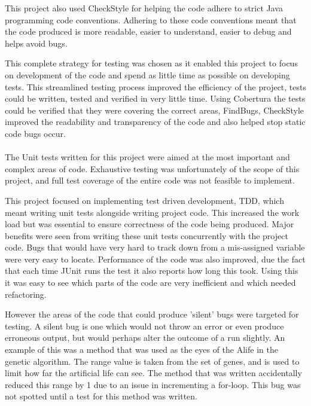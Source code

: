 \documentclass[12pt]{article}
\begin{document}
This project also used
CheckStyle for helping the code adhere to strict Java programming code conventions. Adhering to these code conventions meant that
the code produced is more readable, easier to understand, easier to debug and helps avoid bugs.

This complete strategy for testing was chosen as it enabled this project to focus on development of the code and spend as little
time as possible on developing tests. This streamlined testing process improved the efficiency of the project, tests could 
be written, tested and verified in very little time. Using Cobertura the tests could be verified that they were covering the
correct areas, FindBugs, CheckStyle improved the readability and transparency of the code and also helped stop static code
bugs occur.


\paragraph{}

The Unit tests written for this project were aimed at the most important and complex areas of code. Exhaustive testing was 
unfortunately of the scope of this project, and full test coverage of the entire code was not feasible to implement.

This project focused on implementing test driven development, TDD, which meant writing unit tests alongside writing project code.
This increased the work load but was essential to ensure correctness of the code being produced. Major benefits were seen from
writing these unit tests concurrently with the project code. Bugs that would have very hard to track down from a mis-assigned
variable were very easy to locate. Performance of the code was also improved, due the fact that each time JUnit runs the test
it also reports how long this took. Using this it was easy to see which parts of the code are very inefficient and which needed
refactoring. 

However the 
areas of the code that could produce 'silent' bugs were targeted for testing. A silent bug is one which would not throw an error
or even produce erroneous output, but would perhaps alter the outcome of a run slightly. An example of this was a method that
was used as the eyes of the Alife in the genetic algorithm. The range value is taken from the set of genes, and is used 
to limit how far the artificial life can see. The method that was written accidentally reduced this range by 1 due to an issue
in incrementing a for-loop. This bug was not spotted until a test for this method was written. 
\end{document}
